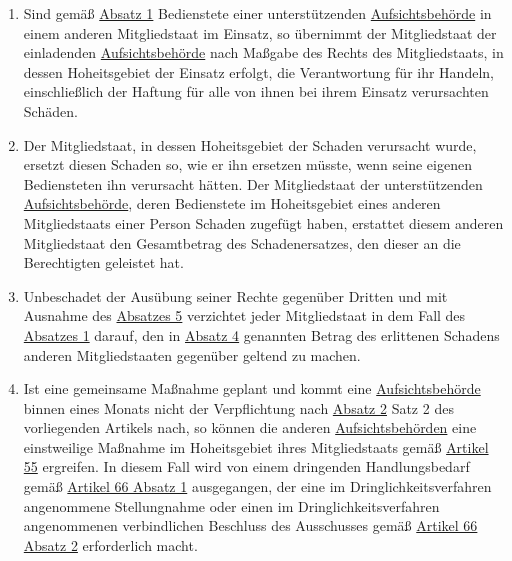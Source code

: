 \begin{enumerate}
  \item Sind gemäß \hyperref[itm:62-1]{Absatz 1} Bedienstete einer unterstützenden \hyperref[itm:04-21]{Aufsichtsbehörde} in einem anderen
   Mitgliedstaat im Einsatz, so übernimmt der Mitgliedstaat der einladenden \hyperref[itm:04-21]{Aufsichtsbehörde} nach Maßgabe des Rechts
   des Mitgliedstaats, in dessen Hoheitsgebiet der Einsatz erfolgt, die Verantwortung für ihr Handeln, einschließlich
   der Haftung für alle von ihnen bei ihrem Einsatz verursachten Schäden.
  \label{itm:62-4}

  \item Der Mitgliedstaat, in dessen Hoheitsgebiet der Schaden verursacht wurde, ersetzt diesen Schaden so, wie er ihn
   ersetzen müsste, wenn seine eigenen Bediensteten ihn verursacht hätten. Der Mitgliedstaat der unterstützenden
   \hyperref[itm:04-21]{Aufsichtsbehörde}, deren Bedienstete im Hoheitsgebiet eines anderen Mitgliedstaats einer Person Schaden zugefügt
   haben, erstattet diesem anderen Mitgliedstaat den Gesamtbetrag des Schadenersatzes, den dieser an die Berechtigten
   geleistet hat.
  \label{itm:62-5}

  \item Unbeschadet der Ausübung seiner Rechte gegenüber Dritten und mit Ausnahme des \hyperref[itm:62-5]{Absatzes 5}
   verzichtet jeder Mitgliedstaat in dem Fall des \hyperref[itm:62-1]{Absatzes 1} darauf, den in \hyperref[itm:62-4]
   {Absatz 4} genannten Betrag des erlittenen Schadens anderen Mitgliedstaaten gegenüber geltend zu machen.
  \label{itm:62-6}

  \item Ist eine gemeinsame Maßnahme geplant und kommt eine \hyperref[itm:04-21]{Aufsichtsbehörde} binnen eines Monats nicht der Verpflichtung
   nach \hyperref[itm:62-2]{Absatz 2} Satz 2 des vorliegenden Artikels nach, so können die anderen \hyperref[itm:04-21]{Aufsichtsbehörden}
   eine einstweilige Maßnahme im Hoheitsgebiet ihres Mitgliedstaats gemäß \hyperref[ch:55]{Artikel 55} ergreifen. In
   diesem Fall wird von einem dringenden Handlungsbedarf gemäß \hyperref[itm:66-1]{Artikel 66 Absatz 1} ausgegangen,
   der eine im Dringlichkeitsverfahren angenommene Stellungnahme oder einen im Dringlichkeitsverfahren angenommenen
   verbindlichen Beschluss des Ausschusses gemäß \hyperref[itm:66-2]{Artikel 66 Absatz 2} erforderlich macht.
  \label{itm:62-7}

\end{enumerate}   


